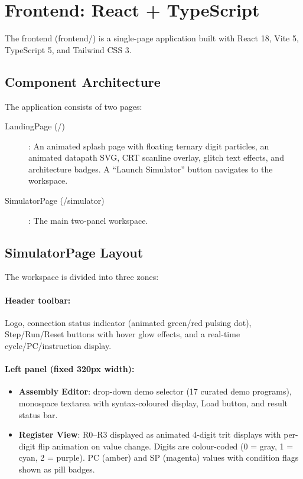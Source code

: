 \documentclass[12pt,a4paper,twoside]{book}
\theoremstyle{trinarytheorem}
\theoremstyle{trinarydefinition}
\newcommand{\code}[1]{\textsf{#1}}
\begin{document}
\section{Frontend: React + TypeScript}

The frontend (\code{frontend/}) is a single-page application built with
React 18, Vite 5, TypeScript 5, and Tailwind CSS 3.

\subsection{Component Architecture}

The application consists of two pages:
\begin{description}
    \item[\code{LandingPage} (\code{/})]: An animated splash page with
          floating ternary digit particles, an animated datapath SVG,
          CRT scanline overlay, glitch text effects, and architecture
          badges. A ``Launch Simulator'' button navigates to the
          workspace.
    \item[\code{SimulatorPage} (\code{/simulator})]: The main
          two-panel workspace.
\end{description}

\subsection{SimulatorPage Layout}

The workspace is divided into three zones:

\paragraph{Header toolbar:} Logo, connection status indicator (animated
green/red pulsing dot), Step/Run/Reset buttons with hover glow effects,
and a real-time cycle/PC/instruction display.

\paragraph{Left panel (fixed 320px width):}
\begin{itemize}
    \item \textbf{Assembly Editor}: drop-down demo selector (17 curated
          demo programs), monospace textarea with syntax-coloured
          display, Load button, and result status bar.
    \item \textbf{Register View}: R0--R3 displayed as animated 4-digit
          trit displays with per-digit flip animation on value change.
          Digits are colour-coded (0 = gray, 1 = cyan, 2 = purple).
          PC (amber) and SP (magenta) values with condition flags shown
          as pill badges.
\end{itemize}
\end{document}
